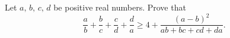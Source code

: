 \documentclass[12pt,a4paper]{book}
\begin{document}
\begin{pro_no_count}
Let $a, \,b, \,c, \,d$ be positive real numbers. Prove that
$$\frac{a}{b}+\frac{b}{c}+\frac{c}{d}+\frac{d}{a} \geqslant 4 + \frac{(a-b)^2}{ab+bc+cd+da}.$$
\end{pro_no_count}
\end{document}
